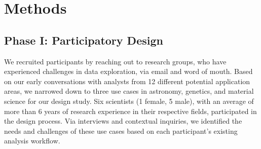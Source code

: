   \section{Methods\label{sec:methods}}
  \subsection{Phase I: Participatory Design}
  \par We recruited participants by reaching out to research groups, who have experienced challenges in data exploration, via email and word of mouth. Based on our early conversations with analysts from 12 different potential application areas, we narrowed down to three use cases in astronomy, genetics, and material science for our design study. Six scientists (1 female, 5 male), with an average of more than 6 years of research experience in their respective fields, participated in the design process. Via interviews and contextual inquiries, we identified the needs and challenges of these use cases based on each participant's existing analysis workflow.
